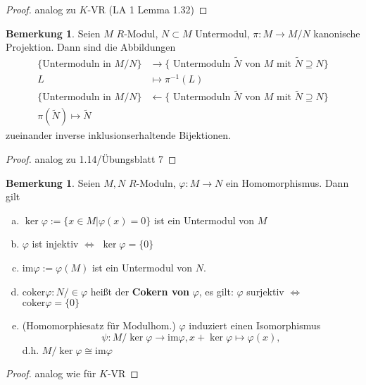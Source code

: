 \documentclass[a4paper, titlepage]{article}
\theoremstyle{definition}
\newtheorem{bem}[satz]{Bemerkung}
\begin{document}
        \begin{proof}
            analog zu $K$-VR (LA 1 Lemma 1.32)
        \end{proof}
        \begin{bem}
            Seien $M$ $R$-Modul, $N\subset M$ Untermodul, $\pi:M\longrightarrow M/N$ kanonische Projektion.\newline 
            Dann sind die Abbildungen 
            \begin{align*}
                \{\text{Untermoduln in }M/N\}&\longrightarrow \{\text{ Untermoduln }\tilde{N}\text{ von }M \text{ mit }\tilde{N} \supseteq N \}\\
                L &\mapsto \pi^{-1}(L)\\
                \{\text{Untermoduln in }M/N\}&\longleftarrow \{\text{ Untermoduln }\tilde{N}\text{ von }M \text{ mit }\tilde{N} \supseteq N \}\\
                \pi(\tilde{N})\mapsto \tilde{N}
            \end{align*}
            zueinander inverse inklusionserhaltende Bijektionen.
        \end{bem}
        \begin{proof}
            analog zu 1.14/Übungsblatt 7
        \end{proof}
        \begin{bem}
            Seien $M,N$ $R$-Moduln, $\varphi:M\longrightarrow N $ ein Homomorphismus. Dann gilt
            \begin{enumerate}[(a)]
                \item $\ker\varphi:=\{x\in M|\varphi(x)=0\}$ ist ein Untermodul von $M$
                \item $\varphi$ ist injektiv $\Leftrightarrow$ $\ker\varphi=\{0\}$
                \item $\mathrm{im}\varphi :=\varphi(M)$ ist ein Untermodul von $N$.
                \item $\mathrm{coker}\varphi:N/\in \varphi$ heißt der \textbf{Cokern von} $\varphi$, es gilt: $\varphi$ surjektiv $\Leftrightarrow$ $\mathrm{coker}\varphi=\{0\}$
                \item (Homomorphiesatz für Modulhom.) $\varphi$ induziert einen Isomorphismus
                $$\psi: M/\ker\varphi\longrightarrow \mathrm{im} \varphi, x+\ker\varphi\mapsto\varphi(x),$$
                d.h. $M/\ker\varphi\cong\mathrm{im}\varphi$
            \end{enumerate}
        \end{bem}
        \begin{proof}
            analog wie für $K$-VR 
        \end{proof}
\end{document}
